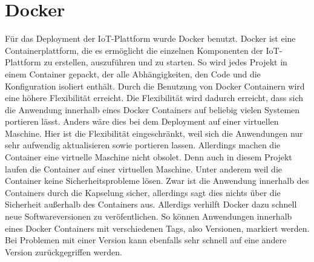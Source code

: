 \section{Docker} 
Für das Deployment der IoT-Plattform wurde Docker benutzt. Docker ist eine Containerplattform, die es ermöglicht die einzelnen Komponenten der IoT-Plattform zu erstellen, auszuführen und zu starten. So wird jedes Projekt in einem Container gepackt, der alle Abhängigkeiten, den Code und die Konfiguration isoliert enthält. Durch die Benutzung von Docker Containern wird eine höhere Flexibilität erreicht. Die Flexibilität wird dadurch erreicht, dass sich die Anwendung innerhalb eines Docker Containers auf beliebig vielen Systemen portieren lässt. Anders wäre dies bei dem Deployment auf einer virtuellen Maschine. Hier ist die Flexibilität eingeschränkt, weil sich die Anwendungen nur sehr aufwendig aktualisieren sowie portieren lassen. Allerdings machen die Container eine virtuelle Maschine nicht obsolet. Denn auch in diesem Projekt laufen die Container auf einer virtuellen Maschine. Unter anderem weil die Container keine Sicherheitsprobleme lösen. Zwar ist die Anwendung innerhalb des Containers durch die Kapselung sicher, allerdings sagt dies nichts über die Sicherheit außerhalb des Containers aus. Allerdigs verhilft Docker dazu schnell neue Softwareversionen zu veröfentlichen. So können Anwendungen innerhalb eines Docker Containers mit verschiedenen Tags, also Versionen, markiert werden. Bei Problemen mit einer Version kann ebenfalls sehr schnell auf eine andere Version zurückgegriffen werden. \cite{docker}